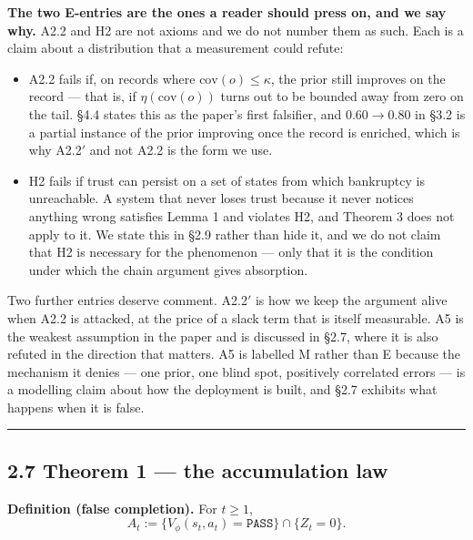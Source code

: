 \documentclass[11pt,a4paper]{article}
\providecommand{\tightlist}{\setlength{\itemsep}{0pt}\setlength{\parskip}{0pt}}
\begin{document}
\textbf{The two E-entries are the ones a reader should press on, and we say why.} A2.2
and H2 are not axioms and we do not number them as such. Each is a claim about a
distribution that a measurement could refute:

\begin{itemize}
\tightlist
\item
  A2.2 fails if, on records where \(\mathrm{cov}(o)\le\kappa\), the prior still
  improves on the record --- that is, if \(\eta(\mathrm{cov}(o))\) turns out to be
  bounded away from zero on the tail. §4.4 states this as the paper's first
  falsifier, and \(0.60\to0.80\) in §3.2 is a partial instance of the prior improving
  once the record is enriched, which is why A2.2\('\) and not A2.2 is the form we use.
\item
  H2 fails if trust can persist on a set of states from which bankruptcy is
  unreachable. A system that never loses trust because it never notices anything
  wrong satisfies Lemma 1 and violates H2, and Theorem 3 does not apply to it. We
  state this in §2.9 rather than hide it, and we do not claim that H2 is necessary
  for the phenomenon --- only that it is the condition under which the chain argument
  gives absorption.
\end{itemize}

Two further entries deserve comment. A2.2\('\) is how we keep the argument alive when
A2.2 is attacked, at the price of a slack term that is itself measurable. A5 is the
weakest assumption in the paper and is discussed in §2.7, where it is also refuted
in the direction that matters. A5 is labelled M rather than E because the mechanism
it denies --- one prior, one blind spot, positively correlated errors --- is a
modelling claim about how the deployment is built, and §2.7 exhibits what happens
when it is false.

\begin{center}\rule{0.5\linewidth}{0.5pt}\end{center}

\subsection{2.7 Theorem 1 --- the accumulation law}\label{theorem-1-the-accumulation-law}

\textbf{Definition (false completion).} For \(t\ge1\),
\begin{equation}
A_t:=\big\{V_\phi(s_t,a_t)=\texttt{PASS}\big\}\cap\{Z_t=0\}.
\tag{2.7.1}
\end{equation}
\end{document}
